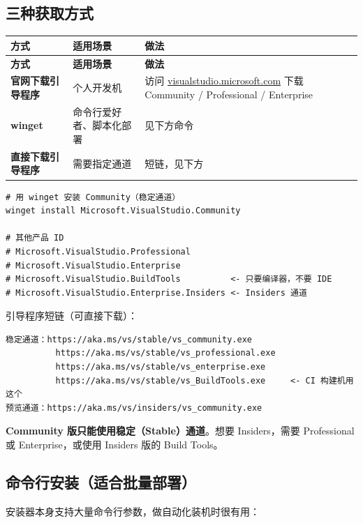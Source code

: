\subsection{三种获取方式}
\begin{longtable}{L{3.4cm}L{4.0cm}L{7.2cm}}
\toprule
\textbf{方式} & \textbf{适用场景} & \textbf{做法} \\
\midrule
\endfirsthead
\toprule
\textbf{方式} & \textbf{适用场景} & \textbf{做法} \\
\midrule
\endhead
\bottomrule
\endlastfoot
\textbf{官网下载引导程序} & 个人开发机 & 访问 \href{https://visualstudio.microsoft.com}{visualstudio.microsoft.com} 下载 Community / Professional / Enterprise \\
\textbf{winget} & 命令行爱好者、脚本化部署 & 见下方命令 \\
\textbf{直接下载引导程序} & 需要指定通道 &  短链，见下方 \\
\end{longtable}

\begin{lstlisting}[style=shellstyle]
# 用 winget 安装 Community（稳定通道）
winget install Microsoft.VisualStudio.Community

# 其他产品 ID
# Microsoft.VisualStudio.Professional
# Microsoft.VisualStudio.Enterprise
# Microsoft.VisualStudio.BuildTools          <- 只要编译器，不要 IDE
# Microsoft.VisualStudio.Enterprise.Insiders <- Insiders 通道
\end{lstlisting}

引导程序短链（可直接下载）：

\begin{lstlisting}[style=textstyle]
稳定通道：https://aka.ms/vs/stable/vs_community.exe
          https://aka.ms/vs/stable/vs_professional.exe
          https://aka.ms/vs/stable/vs_enterprise.exe
          https://aka.ms/vs/stable/vs_BuildTools.exe     <- CI 构建机用这个
预览通道：https://aka.ms/vs/insiders/vs_community.exe
\end{lstlisting}

\begin{warnbox}[注意]
\textbf{Community 版只能使用稳定（Stable）通道}。想要 Insiders，需要 Professional 或 Enterprise，或使用 Insiders 版的 Build Tools。
\end{warnbox}

\subsection{命令行安装（适合批量部署）}
安装器本身支持大量命令行参数，做自动化装机时很有用：

